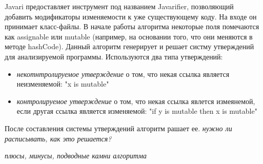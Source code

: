 Javari предоставляет инструмент под названием Javarifier, позволяющий добавить модификаторы изменяемости к уже существующему коду. На входе он принимает класс-файлы. В начале работы алгоритма некоторые поля помечаются как assignable или mutable (например, на основании того, что они меняются в методе hashCode). Данный алгоритм генерирует и решает систму утверждений для анализируемой программы. Используются два типа утверждений:
\begin{itemize}
	
	\item \textit{некотнтролируемое утверждение} о том, что некая ссылка является неизменяемой: "x is mutable"
	
	\item \textit{контролируемое утверждение} о том, что некая ссылка явлется измеянемой, если другая ссылка является изменяемой: "if y is mutable then x is mutable"
	
\end{itemize}
После составления системы утверждений алгоритм рашает ее. \textit{нужно ли расписывать, как это решается?}

\textit{плюсы, минусы, подводные камни алгоритма}


























